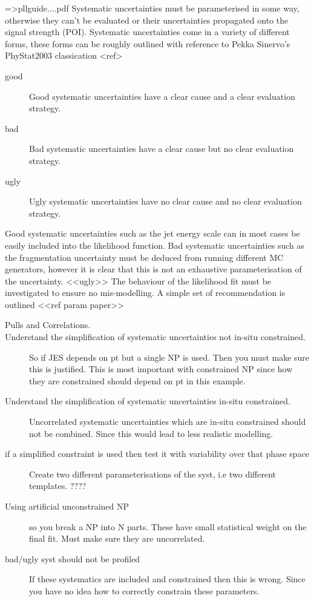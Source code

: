 =>pllguide....pdf
	Systematic uncertainties must be parameterised in some way, otherwise they can't be evaluated or their uncertainties propagated onto the signal strength (POI). 
	Systematic uncertainties come in a variety of different forms, these forms can be roughly outlined with reference to Pekka Sinervo's PhyStat2003 classication <ref>
	\begin{description} 
		\item[good] Good systematic uncertainties have a clear cause and a clear evaluation strategy.
		\item[bad]  Bad systematic uncertainties have a clear cause but no clear evaluation strategy.
		\item[ugly] Ugly systematic uncertainties have no clear cause and no clear evaluation strategy.  
	\end{description} 
	Good systematic uncertainties such as the jet energy scale can in most cases be easily included into the likelihood function. Bad systematic uncertainties such as the fragmentation 			uncertainty must be deduced from running different MC generators, however it is clear that this is not an exhaustive parameterisation of the uncertainty. <<ugly>> 
	The behaviour of the likelihood fit must be investigated to ensure no mis-modelling. A simple set of recommendation is outlined <<ref param paper>>
	\begin{description}
	\item[Pulls and Correlations.] 	
	\item [Understand the simplification of systematic uncertainties not in-situ constrained.] So if JES depends on pt but a single NP is used. Then you must make sure this is justified. This is most important with constrained 	NP since how they are constrained should depend on pt in this example.  
	\item [Understand the simplification of systematic uncertainties in-situ constrained.]  Uncorrelated systematic uncertainties which are in-situ constrained should not be combined. Since 	this would lead to less realistic modelling. 
	\item [if a simplified constraint is used then test it with variability over that phase space ]  Create two different parameterisations of the syst, i.e two different templates. ???? 
	\item [Using artificial unconstrained NP]  so you break a NP into N parts. These have small statistical weight on the final fit. Must make sure they are uncorrelated. 
	\item [bad/ugly syst should not be profiled]  If these systematics are included and constrained then this is wrong. Since you have no idea how to correctly constrain these parameters.   
	\end{description} 
	 


